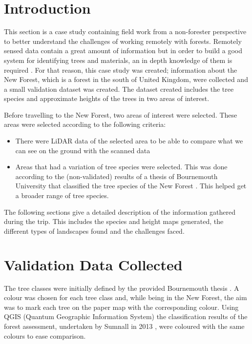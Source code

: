 \documentclass{subfiles}
\begin{document}
	\section{Introduction}
	\par This section is a case study containing field work from a {\color{blue} non-forester perspective} to better understand the challenges of working remotely with forests. Remotely sensed data contain a great amount of information but in order to build a good system for identifying trees and materials, an in depth knowledge of them is required \cite{Smith2012}. For that reason, this case study was created; information about the New Forest, which is a forest in the south of United Kingdom, were collected and a small validation dataset was created. The dataset created includes the tree species and approximate heights of the trees in two areas of interest. 
	

	\par Before travelling to the New Forest, two areas of interest were selected. These areas were selected according to the following criteria:
	\begin{itemize}
		\item There were LiDAR data of the selected area to be able to compare what we can see on the ground with the scanned data
		\item Areas that had a variation of tree species were selected. This was done according to the (non-validated) results of a thesis of Bournemouth University that classified the tree species of the New Forest \cite{Sumnall2013}. This helped get a broader range of tree species. 
	\end{itemize}
	
	\par The following sections give a detailed description of the information gathered during the trip. This includes the species and height maps generated, the different types of landscapes found and the challenges faced. 
		
	
	   \section{Validation Data Collected}
	   \par The tree classes were initially defined by the provided Bournemouth thesis \cite{Sumnall2013}. A colour was chosen for each tree class and, while being in the New Forest, the aim was to mark each tree on the paper map with the corresponding colour. Using QGIS (Quantum Geographic Information System) the classification results of the forest assessment, undertaken by Sumnall in 2013 \cite{Sumnall2013}, were coloured with the same colours to ease comparison.
	   
\end{document}
